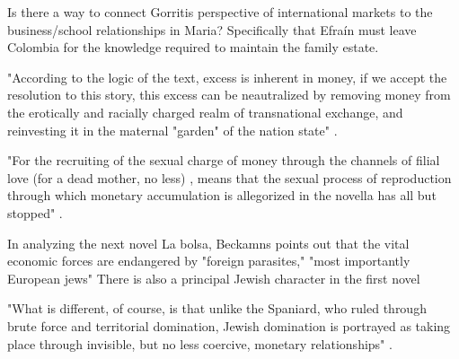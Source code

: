 \documentclass[12pt]{article}
\begin{document}
Is there a way to connect Gorritis perspective of international markets to the business/school relationships in Maria?
Specifically that Efraín must leave Colombia for the knowledge required to maintain the family estate.

"According to the logic of the text, excess is inherent in money, if we accept the resolution to this story, this excess can be neautralized by removing money from the erotically and racially charged realm of transnational exchange, and reinvesting it in the maternal "garden" of the nation state" \cite[105]{Beckman2013}.

"For the recruiting of the sexual charge of money through the channels of filial love (for a dead mother, no less) , means that the sexual process of reproduction through which monetary accumulation is allegorized in the novella has all but stopped" \cite[105]{Beckman2013}.

In analyzing the next novel La bolsa, Beckamns points out that the vital economic forces are endangered by "foreign parasites," "most importantly European jews"
There is also a principal Jewish character in the first novel

"What is different, of course, is that unlike the Spaniard, who ruled through brute force and territorial domination, Jewish domination is portrayed as taking place through invisible, but no less coercive, monetary relationships" \cite[107]{Beckman2013}.
\end{document}
